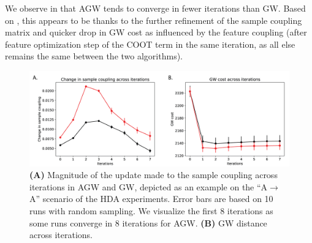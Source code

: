 We observe in  that AGW tends to converge in fewer iterations than GW.
Based on , this appears to be thanks to the further refinement of
the sample coupling matrix and quicker drop in GW cost as influenced by the feature coupling
(after feature optimization step of the COOT term in the same iteration,
as all else remains the same between the two algorithms).
\begin{figure}[h]
    \centering
    \includegraphics[width=\linewidth]{./Chapitre5/fig/timing_plots.png}
    \caption{\label{fig:SI-timing} \textbf{(A)} Magnitude of the update made to the sample coupling
    across iterations in AGW and GW, depicted as an example on the ``A$\rightarrow$A''
    scenario of the HDA experiments. Error bars are based on 10 runs with random sampling.
    We visualize the first 8 iterations as some runs converge in 8 iterations for AGW.
    \textbf{(B)} GW distance across iterations.}
\end{figure}
